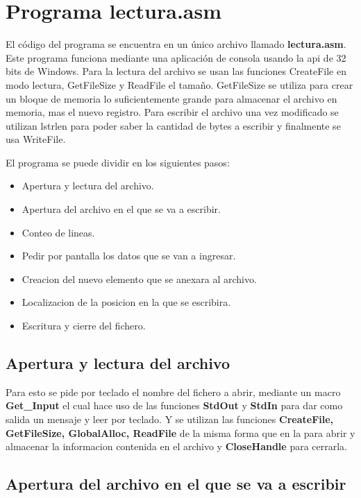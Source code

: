 
\section*{Programa lectura.asm}

El código del programa se encuentra en un único archivo llamado \textbf{lectura.asm}.
Este programa funciona mediante una aplicación de consola usando la api de 32
bits de Windows. Para la lectura del archivo se usan las funciones
CreateFile en modo lectura, GetFileSize y ReadFile el tamaño. GetFileSize
se utiliza para crear un bloque de memoria lo suficientemente grande
para almacenar el archivo en memoria, mas el nuevo registro. Para escribir
el archivo una vez modificado se utilizan lstrlen para poder saber la cantidad
de bytes a escribir y finalmente se usa WriteFile.


El programa se puede dividir en los siguientes pasos:
\begin{itemize}
    \item Apertura y lectura del archivo.
    \item Apertura del archivo en el que se va a escribir.
    \item Conteo de lineas.
    \item Pedir por pantalla los datos que se van a ingresar.
    \item Creacion del nuevo elemento que se anexara al archivo.
    \item Localizacion de la posicion en la que se escribira.
    \item Escritura y cierre del fichero.
\end{itemize}

\subsection*{Apertura y lectura del archivo}

    Para esto se pide por teclado el nombre del fichero a abrir, mediante un
    macro \textbf{Get\_Input} el cual hace uso de las funciones \textbf{StdOut}
    y \textbf{StdIn} para dar como salida un mensaje y leer por teclado.
    Y se utilizan las funciones \textbf{CreateFile, GetFileSize, GlobalAlloc,
    ReadFile} de la misma forma que en la \Cite{pract4} para abrir y almacenar
    la informacion contenida en el archivo y \textbf{CloseHandle} para cerrarla.

\subsection*{Apertura del archivo en el que se va a escribir}

